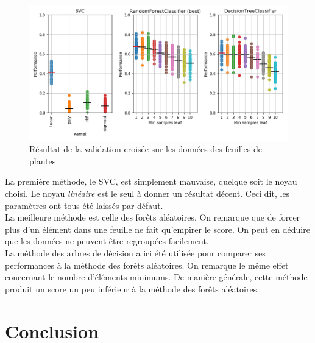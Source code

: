\documentclass[11pt, a4paper]{article}
\begin{document}
\begin{figure}[H]
    \begin{center}
        \includegraphics[width=1\textwidth]{ex3}
    \end{center}
    \caption{Résultat de la validation croisée sur les données des feuilles de plantes}
    \label{Résultat de la validation croisée sur les données des feuilles de plantes}
\end{figure}

La première méthode, le SVC, est simplement mauvaise, quelque soit le noyau choisi.
Le noyau \textit{linéaire} est le seul à donner un résultat décent.
Ceci dit, les paramètres ont tous été laissés par défaut. \\

La meilleure méthode est celle des forêts aléatoires.
On remarque que de forcer plus d'un élément dans une feuille ne fait qu'empirer le score.
On peut en déduire que les données ne peuvent être regroupées facilement. \\

La méthode des arbres de décision a ici été utilisée pour comparer ses performances à la méthode des forêts aléatoires.
On remarque le même effet concernant le nombre d'éléments minimums.
De manière générale, cette méthode produit un score un peu inférieur à la méthode des forêts aléatoires.

\newpage

\section{Conclusion}
\end{document}
